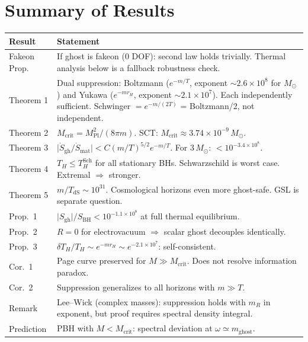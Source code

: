 \documentclass[11pt,a4paper]{article}
\newcommand{\MPl}{M_{\mathrm{Pl}}}
\newcommand{\Msun}{M_{\odot}}
\newcommand{\Mcrit}{M_{\mathrm{crit}}}
\newcommand{\mghost}{m_{\mathrm{ghost}}}
\newcommand{\Thr}{T_{\!\scriptscriptstyle H}}
\theoremstyle{plain}
\theoremstyle{definition}
\begin{document}
\section{Summary of Results}\label{sec:summary}

\begin{center}
\small
\begin{tabular}{@{}p{3cm}p{10cm}@{}}
\toprule
\textbf{Result} & \textbf{Statement} \\
\midrule
Fakeon Prop. & If ghost is fakeon (0 DOF): second law holds trivially.
  Thermal analysis below is a fallback robustness check. \\[3pt]
Theorem 1 & Dual suppression: Boltzmann ($e^{-m/T}$, exponent
  $\sim 2.6\times 10^8$ for $\Msun$) and Yukawa ($e^{-mr_H}$,
  exponent $\sim 2.1\times 10^7$).  Each independently sufficient.
  Schwinger $= e^{-m/(2T)}$ = Boltzmann/2, not independent. \\[3pt]
Theorem 2 & $\Mcrit = \MPl^2/(8\pi m)$.  SCT:
  $\Mcrit \approx 3.74\times 10^{-9}\,\Msun$. \\[3pt]
Theorem 3 & $\lvert\dot S_{\mathrm{gh}}/\dot S_{\mathrm{mat}}\rvert
  < C(m/T)^{5/2}e^{-m/T}$.  For $3\,\Msun$:
  $< 10^{-3.4\times 10^{8}}$. \\[3pt]
Theorem 4 & $\Thr \leq \Thr^{\mathrm{Sch}}$ for all stationary BHs.
  Schwarzschild is worst case.  Extremal $\Rightarrow$ stronger. \\[3pt]
Theorem 5 & $m/T_{\mathrm{dS}} \sim 10^{31}$.  Cosmological horizons
  even more ghost-safe.  GSL is separate question. \\[3pt]
Prop.\ 1 & $\lvert S_{\mathrm{gh}}\rvert/S_{\mathrm{BH}}
  < 10^{-1.1\times 10^{8}}$ at full thermal equilibrium. \\[3pt]
Prop.\ 2 & $R=0$ for electrovacuum $\Rightarrow$ scalar ghost
  decouples identically. \\[3pt]
Prop.\ 3 & $\delta\Thr/\Thr \sim e^{-mr_H} \sim e^{-2.1\times 10^{7}}$:
  self-consistent. \\[3pt]
Cor.\ 1 & Page curve preserved for $M \gg \Mcrit$.  Does not resolve
  information paradox. \\[3pt]
Cor.\ 2 & Suppression generalizes to all horizons with $m \gg T$. \\[3pt]
Remark & Lee--Wick (complex masses): suppression holds with $m_R$ in
  exponent, but proof requires spectral density integral. \\[3pt]
Prediction & PBH with $M < \Mcrit$: spectral deviation at
  $\omega \simeq \mghost$. \\
\bottomrule
\end{tabular}
\end{center}
\end{document}
